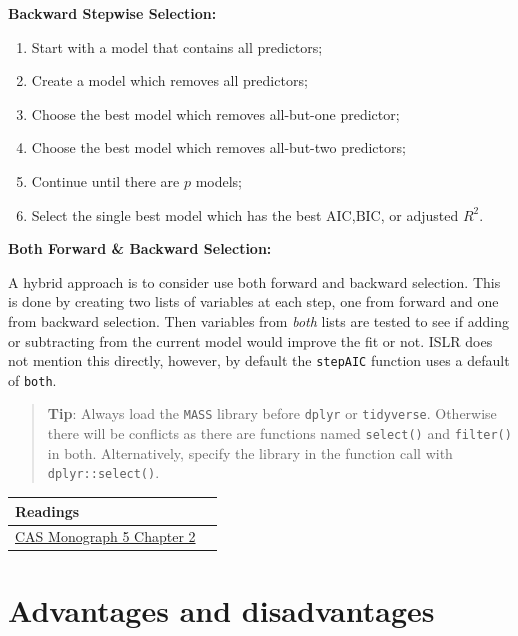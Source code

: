 \documentclass[openany]{book}
\providecommand{\tightlist}{%
  \setlength{\itemsep}{0pt}\setlength{\parskip}{0pt}}
\begin{document}
\textbf{Backward Stepwise Selection:}

\begin{enumerate}
\def\labelenumi{\arabic{enumi}.}
\tightlist
\item
  Start with a model that contains all predictors;
\item
  Create a model which removes all predictors;
\item
  Choose the best model which removes all-but-one predictor;
\item
  Choose the best model which removes all-but-two predictors;
\item
  Continue until there are \(p\) models;
\item
  Select the single best model which has the best \(\text{AIC}\),\(\text{BIC}\), or adjusted \(R^2\).
\end{enumerate}

\textbf{Both Forward \& Backward Selection:}

A hybrid approach is to consider use both forward and backward selection. This is done by creating two lists of variables at each step, one from forward and one from backward selection. Then variables from \emph{both} lists are tested to see if adding or subtracting from the current model would improve the fit or not. ISLR does not mention this directly, however, by default the \texttt{stepAIC} function uses a default of \texttt{both}.

\begin{quote}
\textbf{Tip}: Always load the \texttt{MASS} library before \texttt{dplyr} or \texttt{tidyverse}. Otherwise there will be conflicts as there are functions named \texttt{select()} and \texttt{filter()} in both. Alternatively, specify the library in the function call with \texttt{dplyr::select()}.
\end{quote}

\begin{longtable}[]{@{}ll@{}}
\toprule
Readings &\tabularnewline
\midrule
\endhead
\href{https://www.casact.org/pubs/monographs/papers/05-Goldburd-Khare-Tevet.pdf}{CAS Monograph 5 Chapter 2} &\tabularnewline
\bottomrule
\end{longtable}

\hypertarget{advantages-and-disadvantages}{%
\section{Advantages and disadvantages}\label{advantages-and-disadvantages}}
\end{document}
